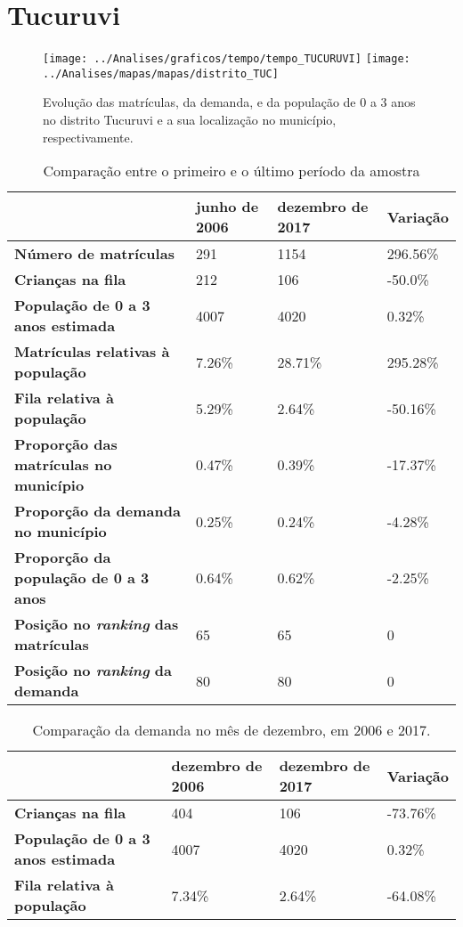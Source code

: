 \section{Tucuruvi}
\begin{figure}[H]
	\centering
	\texttt{[image: ../Analises/graficos/tempo/tempo\_TUCURUVI]}
	\texttt{[image: ../Analises/mapas/mapas/distrito\_TUC]}
	\caption{Evolução das matrículas, da demanda, e da população de 0 a 3 anos no distrito Tucuruvi e a sua localização no município, respectivamente.}
\end{figure}
\begin{table}[H]
	\begin{tabular}{|l|l|l|l|}
		\hline
		\textbf{}                                      & \textbf{junho de 2006}       & \textbf{dezembro de 2017}    & \textbf{Variação} \\ \hline
		\textbf{Número de matrículas}                  & 291 & 1154 & 296.56\% \\ \hline
		\textbf{Crianças na fila}                      & 212 & 106 & -50.0\% \\ \hline
		\textbf{População de 0 a 3 anos estimada}      & 4007 & 4020 & 0.32\% \\ \hline
		\textbf{Matrículas relativas à população}      & 7.26\% & 28.71\% & 295.28\% \\ \hline
		\textbf{Fila relativa à população}             & 5.29\% & 2.64\% & -50.16\% \\ \hline
		\textbf{Proporção das matrículas no município} & 0.47\% & 0.39\% & -17.37\% \\ \hline
		\textbf{Proporção da demanda no município}     & 0.25\% & 0.24\% & -4.28\% \\ \hline
		\textbf{Proporção da população de 0 a 3 anos}  & 0.64\% & 0.62\% & -2.25\% \\ \hline
		\textbf{Posição no \textit{ranking} das matrículas}     & 65 & 65 & 0 \\ \hline
		\textbf{Posição no \textit{ranking} da demanda}         & 80 & 80 & 0 \\ \hline
	\end{tabular}
	\caption{Comparação entre o primeiro e o último período da amostra}
\end{table}
\begin{table}[H]
	\begin{tabular}{|l|l|l|l|}
		\hline
		\textbf{}                                 & \textbf{dezembro de 2006} & \textbf{dezembro de 2017} & \textbf{Variação} \\ \hline
		\textbf{Crianças na fila}                      & 404 & 106 & -73.76\% \\ \hline
		\textbf{População de 0 a 3 anos estimada}      & 4007 & 4020 & 0.32\% \\ \hline
		\textbf{Fila relativa à população}             & 7.34\% & 2.64\% & -64.08\% \\ \hline
	\end{tabular}
	\caption{Comparação da demanda no mês de dezembro, em 2006 e 2017.}
\end{table}
